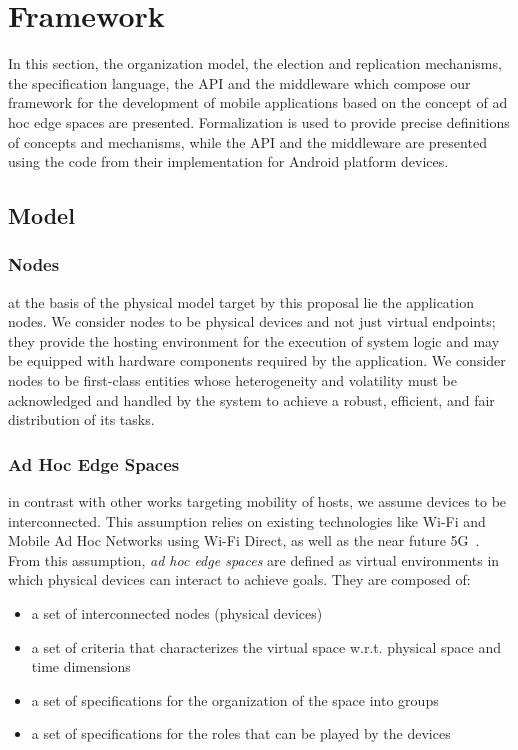 \section{Framework}\label{sec:model}

In this section, the organization model, the election and replication mechanisms, the specification language, the API and the middleware which compose our framework for the development of mobile applications based on the concept of ad hoc edge spaces are presented. Formalization is used to provide precise definitions of concepts and mechanisms, while the API and the middleware are presented using the code from their implementation for Android platform devices.

\subsection{Model}

\subsubsection{Nodes} at the basis of the physical model target by this proposal lie the application nodes. We consider nodes to be physical devices and not just virtual endpoints; they provide the hosting environment for the execution of system logic and may be equipped with hardware components required by the application. We consider nodes to be first-class entities whose heterogeneity and volatility must be acknowledged and handled by the system to achieve a robust, efficient, and fair distribution of its tasks.

\subsubsection{Ad Hoc Edge Spaces} in contrast with other works targeting mobility of hosts, we assume devices to be interconnected. This assumption relies on existing technologies like Wi-Fi and Mobile Ad Hoc Networks using Wi-Fi Direct, as well as the near future 5G~\cite{5G_D2D}. From this assumption, \textit{ad hoc edge spaces} are defined as virtual environments in which physical devices can interact to achieve goals. They are composed of:

\begin{itemize}
	\item a set of interconnected nodes (physical devices)
	\item a set of criteria that characterizes the virtual space w.r.t. physical space and time dimensions
	\item a set of specifications for the organization of the space into groups
	\item a set of specifications for the roles that can be played by the devices
\end{itemize}

